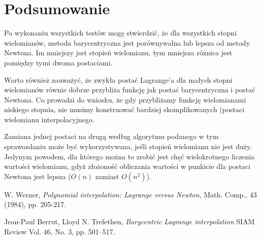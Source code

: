 \documentclass[a4paper]{article}
\begin{document}
\section{Podsumowanie}
Po wykonaniu wszystkich testów mogę stwierdzić, że dla wszystkich stopni wielomianów, 
metoda barycentryczna jest porównywalna lub lepsza od metody Newtona. Im mniejszy jest 
stopień wielomianu, tym mniejsza różnica jest pomiędzy tymi dwoma postaciami.

Warto również zauważyć, że zwykła postać Lagrange'a dla małych stopni wielomianów równie dobrze 
przybliża funkcję jak postać barycentryczna i postać Newtona. Co prowadzi do wniosku, że gdy 
przybliżamy funkcję wielomianami niskiego stopnia, nie musimy konstruować bardziej skomplikowanych
(postaci wielomianu interpolacyjnego. 

Zamiana jednej postaci na drugą według algorytmu podanego w tym sprawozdaniu może być wykorzystywana, 
jeśli stopień wielomianu nie jest duży. Jedynym powodem, dla którego można to zrobić jest chęć 
wielokrotnego liczenia wartości wielomianu, gdyż złożoność obliczania wartości w punkicie dla postaci
Newtona jest lepsza ($O(n)$ zamiast $O(n^2)$).

\begin{thebibliography}{9}
  W. Werner, 
  \textit{Polynomial interpolation: Lagrange versus Newton}, 
  Math. Comp., 43 (1984), pp. 205-217.

    Jean-Paul Berrut, Lloyd N. Trefethen,
    \textit{Barycentric Lagrange interpolation}
    SIAM Review Vol. 46, No. 3, pp. 501–517.
\end{thebibliography}
\end{document}
